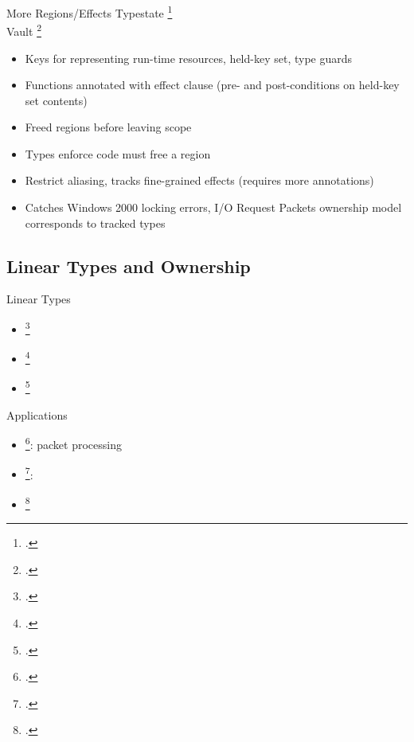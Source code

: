 \documentclass[aspectratio=169]{beamer}
\begin{document}
\begin{frame}{More Regions/Effects}
Typestate \footcite{strom_typestate:_1986} %
\\
Vault \footcite{deline_enforcing_2001} %
    \begin{itemize}
        \item Keys for representing run-time resources, held-key set, type guards
        \item Functions annotated with effect clause (pre- and post-conditions on held-key set contents)
        \item Freed regions before leaving scope
        \item Types enforce code must free a region
        \item Restrict aliasing, tracks fine-grained effects (requires more annotations)
        \item Catches Windows 2000 locking errors, I/O Request Packets ownership model corresponds to tracked types
    \end{itemize}
\end{frame}

\subsection{Linear Types and Ownership}

\begin{frame}{Linear Types}
    \begin{itemize}
        \item \footcite{girard_linear_1987}
        \item \footcite{wadler_linear_1990}
        \item \footcite{kobayashi_quasi-linear_1999}
    \end{itemize}
\end{frame}

\begin{frame}{Applications}
    \begin{itemize}
        \item \footcite{ennals_linear_2004}: packet processing
        \item \footcite{hawblitzel_low-level_2004}: 
        \item \footcite{tov_practical_2011}
    \end{itemize}
\end{frame}
\end{document}
